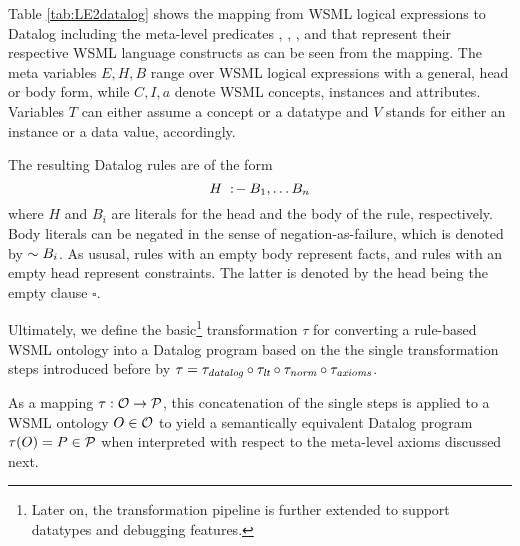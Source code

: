 Table \ref{tab:LE2datalog} shows the mapping from WSML logical
expressions to Datalog including the meta-level predicates \psco,
\pmo, \phval, \pitype and \potype that represent their respective
WSML language constructs as can be seen from the mapping. The meta
variables $E,H,B$ range over WSML logical expressions with a
general, head or body form, while $C,I,a$ denote WSML concepts,
instances and attributes. Variables $T$ can either assume a
concept or a datatype and $V$ stands for either an instance or a
data value, accordingly.

The resulting Datalog rules are of the form $$H \lprl B_1 , \dots
B_n$$ where $H$ and $B_i$ are literals for the head and the body
of the rule, respectively. Body literals can be negated in the
sense of negation-as-failure, which is denoted by $\dlognot B_i$.
As ususal, rules with an empty body represent facts, and rules
with an empty head represent constraints. The latter is denoted by
the head being the empty clause $\square$.

Ultimately, we define the basic\footnote{Later on, the
transformation pipeline is further extended to support datatypes
and debugging features.} transformation $\tau$ for converting a
rule-based WSML ontology into a Datalog program based on the the
single transformation steps introduced before by $ \tau =
\transdlog \circ \translt \circ \transnorm \circ \transax$.

As a mapping $\tau: \O \rightarrow \P$, this concatenation of the
single steps is applied to a WSML ontology $O \in \O$ to yield a
semantically equivalent Datalog program $\tau (O) = P \in \P$ when
interpreted with respect to the meta-level axioms discussed next.
